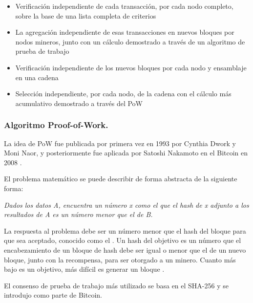 \begin{itemize}
    \item Verificación independiente de cada transacción, por cada nodo completo, sobre la base de una lista completa 
    de criterios
    \item La agregación independiente de esas transacciones en nuevos bloques por nodos mineros, junto con un cálculo 
    demostrado a través de un algoritmo de prueba de trabajo
    \item Verificación independiente de los nuevos bloques por cada nodo y ensamblaje en una cadena
    \item Selección independiente, por cada nodo, de la cadena con el cálculo más acumulativo demostrado a través del 
    PoW
\end{itemize}

\subsubsection*{Algoritmo Proof-of-Work.}

La idea de PoW fue publicada por primera vez en 1993 por Cynthia Dwork y Moni Naor, y posteriormente fue 
aplicada por Satoshi Nakamoto en el Bitcoin en 2008 \cite{proof-of-work}. 

\vspace{5mm}

\noindent El problema matemático se puede describir de forma abstracta de la siguiente forma: 

\vspace{5mm}

\noindent \textit{Dados los datos A, encuentra un número x como el que el hash de x adjunto a los resultados de A es un 
número menor que el de B.}

\vspace{5mm}

\noindent La respuesta al problema debe ser un número menor que el hash del bloque para que sea aceptado, conocido como 
el . Un hash del objetivo es un número que el encabezamiento de un bloque de hash debe ser igual 
o menor que el de un nuevo bloque, junto con la recompensa, para ser otorgado a un minero. Cuanto más bajo es un 
objetivo, más difícil es generar un bloque \cite{proof-of-work}.

\vspace{5mm}

\noindent El consenso de prueba de trabajo más utilizado se basa en el SHA-256 y se introdujo como parte de Bitcoin.

